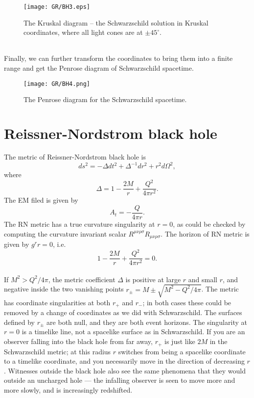 \begin{figure}[!htb]
\centering
\texttt{[image: GR/BH3.eps]}
\caption{The Kruskal diagram -- the Schwarzschild solution in Kruskal coordinates, where all light cones are at $\pm 45^{\circ}$.}
\end{figure}

\noindent
\\
Finally, we can further transform the coordinates to bring them into a finite range and get the Penrose diagram of Schwarzschild spacetime.

\begin{figure}[!htb]
\centering
\texttt{[image: GR/BH4.png]}
\caption{The Penrose diagram for the Schwarzschild spacetime.}
\end{figure}

\section{Reissner-Nordstrom black hole}
The metric of Reissner-Nordstrom black hole is
\[ds^2 = -\Delta dt^2 + \Delta^{-1}dr^2 + r^2d\Omega^2,\]
where
\[\Delta = 1 - \frac{2M}{r} + \frac{Q^2}{4 \pi r^2}.\]
The EM filed is given by
\[A_{t} = -\frac{Q}{4\pi r}.\]
The RN metric has a true curvature singularity at $r = 0$, as could be checked by computing the curvature invariant scalar $R^{\mu\nu\rho\sigma}R_{\mu\nu\rho\sigma}$. 
The horizon of RN metric is given by $g^{r}{r} = 0$, i.e.
\[1 - \frac{2M}{r} + \frac{Q^2}{4 \pi r^2} = 0.\]
\\
If $M^2 > Q^2 / 4 \pi$, the metric coefficient $\Delta$ is positive at large $r$ and small $r$, and negative inside the two vanishing points $r_{\pm} = M \pm \sqrt{M^2 - Q^2 / 4 \pi}$. 
The metric has coordinate singularities at both $r_{+}$ and $r_{-}$; in both cases these could be removed by a change of coordinates as we did with Schwarzschild.
The surfaces defined by $r_{\pm}$ are both null, and they are both event horizons. 
The singularity at $r = 0$ is a timelike line, not a spacelike surface as in Schwarzschild. 
If you are an observer falling into the black hole from far away, $r_{+}$ is just like $2M$ in the Schwarzschild metric; at this radius $r$ switches from being a spacelike coordinate to a timelike coordinate, and you necessarily move in the direction of decreasing $r$. 
Witnesses outside the black hole also see the same phenomena that they would outside an uncharged hole --- the infalling observer is seen to move more and more slowly, and is increasingly redshifted.
\\ \\
